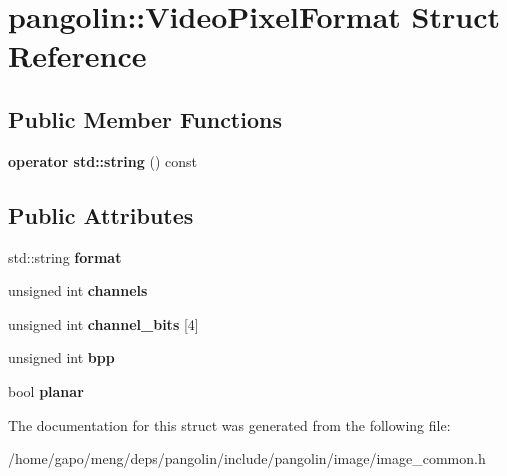 \hypertarget{structpangolin_1_1_video_pixel_format}{}\section{pangolin\+:\+:Video\+Pixel\+Format Struct Reference}
\label{structpangolin_1_1_video_pixel_format}
\subsection*{Public Member Functions}
\begin{DoxyCompactItemize}
\item 
{\bfseries operator std\+::string} () const \hypertarget{structpangolin_1_1_video_pixel_format_a2e9c6fd94f4a348e13a77ca5f386ca6c}{}\label{structpangolin_1_1_video_pixel_format_a2e9c6fd94f4a348e13a77ca5f386ca6c}

\end{DoxyCompactItemize}
\subsection*{Public Attributes}
\begin{DoxyCompactItemize}
\item 
std\+::string {\bfseries format}\hypertarget{structpangolin_1_1_video_pixel_format_abc6b2c87262db7ab31857dc94d905045}{}\label{structpangolin_1_1_video_pixel_format_abc6b2c87262db7ab31857dc94d905045}

\item 
unsigned int {\bfseries channels}\hypertarget{structpangolin_1_1_video_pixel_format_a64462d775dafbd68bec9a27cabdca96f}{}\label{structpangolin_1_1_video_pixel_format_a64462d775dafbd68bec9a27cabdca96f}

\item 
unsigned int {\bfseries channel\+\_\+bits} \mbox{[}4\mbox{]}\hypertarget{structpangolin_1_1_video_pixel_format_ac5c161349784df2f695af1aa1d9660b9}{}\label{structpangolin_1_1_video_pixel_format_ac5c161349784df2f695af1aa1d9660b9}

\item 
unsigned int {\bfseries bpp}\hypertarget{structpangolin_1_1_video_pixel_format_a631428ed45c68dc4c98fa7043dbd346a}{}\label{structpangolin_1_1_video_pixel_format_a631428ed45c68dc4c98fa7043dbd346a}

\item 
bool {\bfseries planar}\hypertarget{structpangolin_1_1_video_pixel_format_a6ce0d5e4e14ec4209df548408a476eab}{}\label{structpangolin_1_1_video_pixel_format_a6ce0d5e4e14ec4209df548408a476eab}

\end{DoxyCompactItemize}


The documentation for this struct was generated from the following file\+:\begin{DoxyCompactItemize}
\item 
/home/gapo/meng/deps/pangolin/include/pangolin/image/image\+\_\+common.\+h\end{DoxyCompactItemize}
